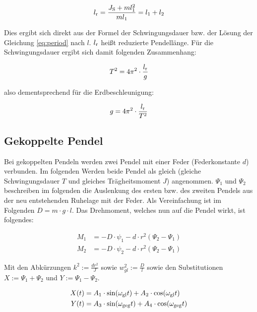 \begin{equation*}
l_{\mathrm{r}} = \frac{J_{\mathrm{S}}+ml^2_1}{ml_1} = l_1 + l_2
\end{equation*}

Dies ergibt sich direkt aus der Formel der Schwingungsdauer bzw. der Lösung der Gleichung \ref{eq:period} nach $l$. $l_{\mathrm{r}}$ heißt reduzierte Pendellänge. Für die Schwingungsdauer ergibt sich damit folgenden Zusammenhang:

\begin{equation*}
T^2 = 4\pi^2 \cdot \frac{l_{\mathrm{r}}}{g}
\end{equation*}

also dementsprechend für die Erdbeschleunigung:

\begin{equation}
g = 4\pi^2 \cdot \frac{l_{\mathrm{r}}}{T^2}
\label{eq:gravity}
\end{equation}

\subsection{Gekoppelte Pendel}
Bei gekoppelten Pendeln werden zwei Pendel mit einer Feder (Federkonstante $d$) verbunden. Im folgenden Werden beide Pendel als gleich (gleiche Schwingungsdauer $T$ und gleiches Trägheitsmoment $J$) angenommen. $\Psi_1$ und $\Psi_2$ beschreiben im folgenden die Auslenkung des ersten bzw. des zweiten Pendels aus der neu entstehenden Ruhelage mit der Feder. Als Vereinfachung ist im Folgenden $D = m \cdot g \cdot l$. Das Drehmoment, welches nun auf die Pendel wirkt, ist folgendes:

\begin{align}
M_1 &= -D \cdot \psi_1 - d \cdot r^2(\Psi_2 - \Psi_1)   \label{eq:drehmoment1} \\
M_2 &= -D \cdot \psi_2 - d \cdot r^2(\Psi_2 - \Psi_1)   \label{eq:drehmoment2}
\end{align}

Mit den Abkürzungen $k^2 := \frac{dr^2}{J}$ sowie $w_{gl}^2 := \frac{D}{l}$ sowie den Substitutionen $X := \Psi_1 + \Psi_2$ und $Y := \Psi_1 - \Psi_2$.

\begin{align}
X(t) &= A_1 \cdot \sin (\omega_{\mathrm{gl}}t) + A_2 \cdot \cos (\omega_{\mathrm{gl}}t)		\label{eq:subst1} \\
Y(t) &= A_3 \cdot \sin (\omega_{\mathrm{geg}}t) + A_4 \cdot \cos (\omega_{\mathrm{geg}}t) 	\label{eq:subst2}
\end{align}

